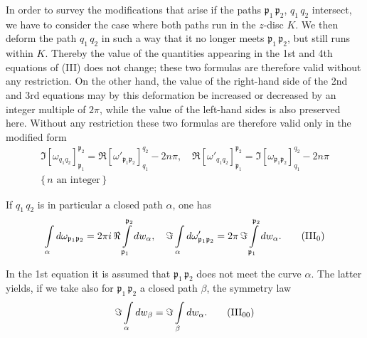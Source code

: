 \documentclass{article}
\begin{document}
In order to survey the modifications that arise if the paths $\mathfrak{p}_1\,\mathfrak{p}_2$, $q_1\,q_2$ intersect, we have to consider the case where both paths run in the $z$-disc $K$. We then deform the path $q_1\,q_2$ in such a way that it no longer meets $\mathfrak{p}_1\,\mathfrak{p}_2$, but still runs within $K$. Thereby the value of the quantities appearing in the 1st and 4th equations of (III) does not change; these two formulas are therefore valid without any restriction. On the other hand, the value of the right-hand side of the 2nd and 3rd equations may by this deformation be increased or decreased by an integer multiple of $2\pi$, while the value of the left-hand sides is also preserved here. Without any restriction these two formulas are therefore valid only in the modified form
\[ \begin{gathered}
\Im [\omega_{q_1 q_2}]_{\mathfrak{p}_1}^{\mathfrak{p}_2} = \Re [\omega'_{\mathfrak{p}_1 \mathfrak{p}_2}]_{q_1}^{q_2} - 2n\pi, \quad \Re [\omega'_{q_1 q_2}]_{\mathfrak{p}_1}^{\mathfrak{p}_2} = \Im [\omega_{\mathfrak{p}_1 \mathfrak{p}_2}]_{q_1}^{q_2} - 2n\pi \\
\{\, n \text{ an integer} \,\}
\end{gathered} \]

If $q_1\,q_2$ is in particular a closed path $\alpha$, one has
\[ \int\limits_\alpha d\omega_{\mathfrak{p}_1 \mathfrak{p}_2} = 2\pi i\,\Re \int\limits_{\mathfrak{p}_1}^{\mathfrak{p}_2} dw_\alpha, \quad \Im \int\limits_\alpha d\omega'_{\mathfrak{p}_1 \mathfrak{p}_2} = 2\pi\,\Im \int\limits_{\mathfrak{p}_1}^{\mathfrak{p}_2} dw_\alpha. \tag{$\mathrm{III}_0$} \]

In the 1st equation it is assumed that $\mathfrak{p}_1\,\mathfrak{p}_2$ does not meet the curve $\alpha$. The latter yields, if we take also for $\mathfrak{p}_1\,\mathfrak{p}_2$ a closed path $\beta$, the symmetry law
\[ \Im \int\limits_\alpha dw_\beta = \Im \int\limits_\beta dw_\alpha. \tag{$\mathrm{III}_{00}$} \]
\end{document}
